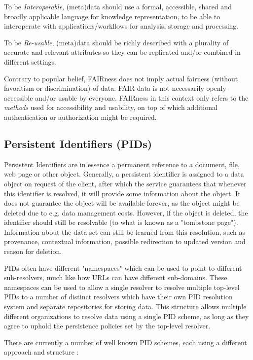 \documentclass[conference]{IEEEtran}
\begin{document}
To be \textit{Interoperable}, (meta)data should use a formal, accessible, shared and broadly applicable language for knowledge representation, to be able to interoperate with applications/workflows for analysis, storage and processing.

To be \textit{Re-usable}, (meta)data should be richly described with a plurality of accurate and relevant attributes so they can be replicated and/or combined in different settings. 

Contrary to popular belief, FAIRness does not imply actual fairness (without favoritism or discrimination) of data. FAIR data is not necessarily openly accessible and/or usable by everyone. FAIRness in this context only refers to the \textit{methods} used for accessibility and usability, on top of which additional authentication or authorization might be required.

\subsection{Persistent Identifiers (PIDs)}
\label{sec:pids}

Persistent Identifiers are in essence a permanent reference to a document, file, web page or other object. Generally, a persistent identifier is assigned to a data object on request of the client, after which the service guarantees that whenever this identifier is resolved, it will provide some information about the object. It does not guarantee the object will be available forever, as the object might be deleted due to e.g. data management costs. However, if the object is deleted, the identifier should still be resolvable (to what is known as a "tombstone page"). Information about the data set can still be learned from this resolution, such as provenance, contextual information, possible redirection to updated version and reason for deletion.

PIDs often have different "namespaces" which can be used to point to different sub-resolvers, much like how URLs can have different sub-domains. These namespaces can be used to allow a single resolver to resolve multiple top-level PIDs to a number of distinct resolvers which have their own PID resolution system and separate repositories for storing data. This structure allows multiple different organizations to resolve data using a single PID scheme, as long as they agree to uphold the persistence policies set by the top-level resolver.

There are currently a number of well known PID schemes, each using a different approach and structure \cite{workpackage6}:
\end{document}
